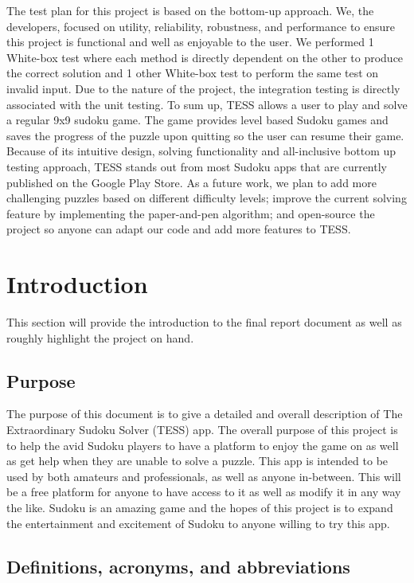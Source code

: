 \documentclass{article}
\begin{document}
The test plan for this project is based on the bottom-up approach. We, the developers, focused on utility, reliability, robustness, and performance to ensure this project is functional and well as enjoyable to the user. We performed 1 White-box test where each method is directly dependent on the other to produce the correct solution and 1 other White-box test to perform the same test on invalid input. Due to the nature of the project, the integration testing is directly associated with the unit testing. \newline \newline
To sum up, TESS allows a user to play and solve a regular 9x9 sudoku game. The game provides level based Sudoku games and saves the progress of the puzzle upon quitting so the user can resume their game. Because of its intuitive design, solving functionality and all-inclusive bottom up testing approach, TESS stands out from most Sudoku apps that are currently published on the Google Play Store. \newline \newline
As a future work, we plan to add more challenging puzzles based on different difficulty levels; improve the current solving feature by implementing the paper-and-pen algorithm; and open-source the project so anyone can adapt our code and add more features to TESS. 

 
\section{Introduction}
 This section will provide the introduction to the final report document as well as roughly highlight the project on hand.
\subsection{Purpose}
The purpose of this document is to give a detailed and overall description of The Extraordinary Sudoku Solver (TESS) app. The overall purpose of this project is to help the avid Sudoku players to have a platform to enjoy the game on as well as get help when they are unable to solve a puzzle. This app is intended to be used by both amateurs and professionals, as well as anyone in-between. This will be a free platform for anyone to have access to it as well as modify it in any way the like. Sudoku is an amazing game and the hopes of this project is to expand the entertainment and excitement of Sudoku to anyone willing to try this app.

\subsection{Definitions, acronyms, and abbreviations}
\end{document}
